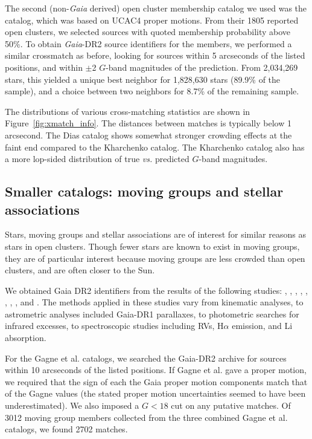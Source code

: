 \documentclass[12pt,twocolumn,tighten]{aastex62}
\begin{document}
The second (non-{\it Gaia} derived) open cluster membership catalog we
used was the \citet{dias_proper_2014} catalog, which was based on
UCAC4 proper motions.
From their 1805 reported open clusters, we selected sources with
quoted membership probability above 50\%.
To obtain {\it Gaia}-DR2 source identifiers for the members, we
performed a similar crossmatch as before, looking for sources within 5
arcseconds of the listed positions, and within $\pm$2 $G$-band
magnitudes of the prediction.
From 2{,}034{,}269 stars, this yielded a unique
best neighbor for 1{,}828{,}630 stars (89.9\% of the sample), and a choice
between two neighbors for 8.7\% of the remaining sample. 

The distributions of various cross-matching statistics are shown in
Figure~\ref{fig:xmatch_info}.  The distances between matches is
typically below 1 arcsecond.  The Dias catalog shows somewhat stronger
crowding effects at the faint end compared to the Kharchenko catalog.
The Kharchenko catalog also has a more lop-sided distribution of true
{\it vs.} predicted $G$-band magnitudes.


\subsection{Smaller catalogs: moving groups and stellar associations}
\label{subsec:mg}

Stars, moving groups and stellar associations are of interest for
similar reasons as stars in open clusters.  Though fewer stars
are known to exist in moving groups, they are of particular interest
because moving groups are less crowded than open clusters, and are
often closer to the Sun.

We obtained Gaia DR2 identifiers from the results of the following
studies:
\citet{gagne_banyan_XI_2018},
\citet{gagne_banyan_XII_2018},
\citet{gagne_banyan_XIII_2018},
\citet{kraus_tucanahor_2014},
\citet{roser_deep_2011}, %
\citet{bell_32ori_2017},
\citet{rizzuto_multidimensional_2011},
\citet{oh_comoving_2017}, and
\citet{zari_3d_2018}. The methods applied in these studies
vary from kinematic analyses, to astrometric analyses included
Gaia-DR1 parallaxes, to photometric searches for infrared excesses, to
spectroscopic studies including RVs, H$\alpha$
emission, and Li absorption.

For the Gagne et al{.} catalogs, we searched the Gaia-DR2 archive for
sources within 10 arcseconds of the listed positions.  If Gagne et
al{.} gave a proper motion, we required that the sign of each the Gaia
proper motion components match that of the Gagne values (the stated
proper motion uncertainties seemed to have been underestimated).  We
also imposed a $G<18$ cut on any putative matches.  Of 3012 moving
group members collected from the three combined Gagne et al{.}
catalogs, we found 2702 matches.
\end{document}
